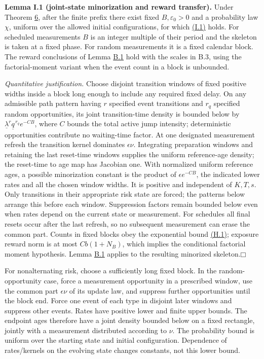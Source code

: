 \documentclass[11pt]{article}
\providecommand{\square}{\mdlgwhtsquare}
\begin{document}
\label{res:Lemma-I.1}
\textbf{Lemma I.1 (joint-state minorization and reward transfer).} Under Theorem \hyperref[res:Theorem-6]{6}, after the finite prefix there exist fixed \(B,\varepsilon_0>0\) and a probability law \(\chi\), uniform over the allowed initial configurations, for which \hyperref[eq:I.1]{(I.1)} holds. For scheduled measurements \(B\) is an integer multiple of their period and the skeleton is taken at a fixed phase. For random measurements it is a fixed calendar block. The reward conclusions of Lemma \hyperref[res:Lemma-B.1]{B.1} hold with the scales in B.3, using the factorial-moment variant when the event count in a block is unbounded.

\emph{Quantitative justification.} Choose disjoint transition windows of fixed positive widths inside a block long enough to include any required fixed delay. On any admissible path pattern having \(r\) specified event transitions and \(r_q\) specified random opportunities, its joint transition-time density is bounded below by
\(\underline\lambda^r\underline q^{\,r_q}e^{-C B}\), where \(C\) bounds the total active jump intensity; deterministic opportunities contribute no waiting-time factor. At one designated measurement refresh the transition kernel dominates \(\epsilon\nu\). Integrating preparation windows and retaining the last reset-time windows supplies the uniform reference-age density; the reset-time to age map has Jacobian one. With normalized uniform reference ages, a possible minorization constant is the product of \(\epsilon e^{-CB}\), the indicated lower rates and all the chosen window widths. It is positive and independent of \(K,T,s\). Only transitions in their appropriate risk state are forced; the patterns below arrange this before each window. Suppression factors remain bounded below even when rates depend on the current state or measurement. For schedules all final resets occur after the last refresh, so no subsequent measurement can erase the common part. Counts in fixed blocks obey the exponential bound \hyperref[eq:H.1]{(H.1)}; exposure reward norm is at most \(Cb(1+N_B)\), which implies the conditional factorial moment hypothesis. Lemma \hyperref[res:Lemma-B.1]{B.1} applies to the resulting minorized skeleton.\hfill$\square$

For nonalternating risk, choose a sufficiently long fixed block. In the random-opportunity case, force a measurement opportunity in a prescribed window, use the common part \(\epsilon\nu\) of its update law, and suppress further opportunities until the block end. Force one event of each type in disjoint later windows and suppress other events. Rates have positive lower and finite upper bounds. The endpoint ages therefore have a joint density bounded below on a fixed rectangle, jointly with a measurement distributed according to \(\nu\). The probability bound is uniform over the starting state and initial configuration. Dependence of rates/kernels on the evolving state changes constants, not this lower bound.
\end{document}
